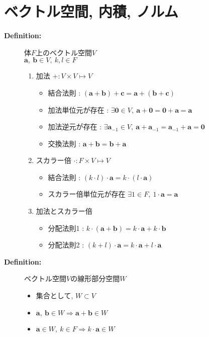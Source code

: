 \documentclass[dvipdfmx]{jsarticle}
\begin{document}
\section{ベクトル空間, 内積, ノルム}
\begin{description}
    \item[\bf{Definition:}] 体$F$上のベクトル空間$V$ \\
        $\bm{a},\ \bm{b} \in V,\ k, l \in F$ 
        \begin{enumerate}
            \item 加法 $ + : V \times V \mapsto V $
                \begin{itemize}
                    \item 結合法則 : $ (\bm{a} + \bm{b}) + \bm{c} = \bm{a} + (\bm{b} + \bm{c})$
                    \item 加法単位元が存在 : $ \exists \bm{0} \in V,\ \bm{a} + \bm{0} = \bm{0} + \bm{a} = \bm{a} $
                    \item 加法逆元が存在 : $ \exists \bm{a}_{-1} \in V,\ \bm{a} + \bm{a}_{-1} = \bm{a}_{-1} + \bm{a} = \bm{0} $
                    \item 交換法則 : $ \bm{a} + \bm{b} = \bm{b} + \bm{a} $
                \end{itemize}
            \item スカラー倍 $ \cdot : F \times V \mapsto V $
                \begin{itemize}
                    \item 結合法則 : $(k \cdot l) \cdot \bm{a} = k \cdot (l \cdot \bm{a})$
                    \item スカラー倍単位元が存在 $ \exists 1 \in F,\ 1 \cdot \bm{a} = \bm{a} $
                \end{itemize}
            \item 加法とスカラー倍
                \begin{itemize}
                    \item 分配法則1 : $ k \cdot (\bm{a} + \bm{b}) = k \cdot \bm{a} + k \cdot \bm{b}$
                    \item 分配法則2 : $ (k + l) \cdot \bm{a} = k \cdot \bm{a} + l \cdot \bm{a}$
                \end{itemize}
        \end{enumerate}
    \item[\bf{Definition:}] ベクトル空間$V$の線形部分空間$W$
        \begin{itemize}
            \item 集合として, $W \subset V$
            \item $\bm{a},\ \bm{b} \in W \Rightarrow \bm{a} + \bm{b} \in W$
            \item $\bm{a} \in W,\ k \in F \Rightarrow k \cdot \bm{a} \in W$
        \end{itemize}


\end{description}
\end{document}
